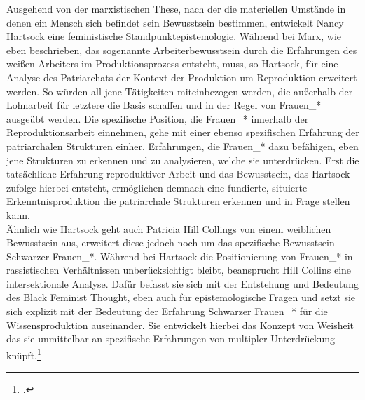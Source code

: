 Ausgehend von der marxistischen These, nach der die materiellen Umstände in
denen ein Mensch sich befindet sein Bewusstsein bestimmen, entwickelt Nancy
Hartsock eine feministische Standpunktepistemologie. Während bei Marx, wie eben
beschrieben, das sogenannte Arbeiterbewusstsein durch die Erfahrungen des
weißen Arbeiters im Produktionsprozess entsteht, muss, so Hartsock, für eine
Analyse des Patriarchats der Kontext der Produktion um Reproduktion erweitert
werden. So würden all jene Tätigkeiten miteinbezogen werden, die außerhalb der
Lohnarbeit für letztere die Basis schaffen und in der Regel von Frauen\_*
ausgeübt werden. Die spezifische Position, die Frauen\_* innerhalb der
Reproduktionsarbeit einnehmen, gehe mit einer ebenso spezifischen Erfahrung der
patriarchalen Strukturen einher. Erfahrungen, die Frauen\_* dazu befähigen, eben
jene Strukturen zu erkennen und zu analysieren, welche sie unterdrücken. Erst
die tatsächliche Erfahrung reproduktiver Arbeit und das Bewusstsein, das
Hartsock zufolge hierbei entsteht, ermöglichen demnach eine fundierte,
situierte Erkenntnisproduktion die patriarchale Strukturen erkennen und in
Frage stellen kann.\footnotemark {}\\ 

Ähnlich wie Hartsock geht auch Patricia Hill Collings von einem weiblichen
Bewusstsein aus, erweitert diese jedoch noch um das spezifische Bewusstsein
Schwarzer Frauen\_*. Während bei Hartsock die Positionierung von Frauen\_* in
rassistischen Verhältnissen unberücksichtigt bleibt, beansprucht Hill Collins
eine intersektionale Analyse. Dafür befasst sie sich mit der Entstehung und
Bedeutung des Black Feminist Thought, eben auch für epistemologische Fragen und
setzt sie sich explizit mit der Bedeutung der Erfahrung Schwarzer Frauen\_* für
die Wissensproduktion auseinander. Sie entwickelt hierbei das Konzept von
Weisheit das sie unmittelbar an spezifische Erfahrungen von multipler
Unterdrückung knüpft.\footnotemark \footcitetext{hillcollins}\\ 

